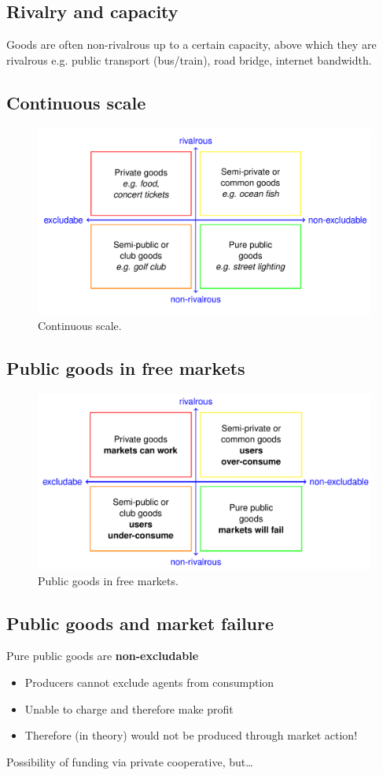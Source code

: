 \subsection{Rivalry and capacity}
Goods are often non-rivalrous up to a certain capacity, above which they are rivalrous e.g. public transport (bus/train), road bridge, internet bandwidth.
\subsection{Continuous scale}
\begin{figure}[H]
  \centering
  \includegraphics[width = \textwidth]{./img/figure14.png}
  \caption{Continuous scale.}
\end{figure}
\subsection{Public goods in free markets}
\begin{figure}[H]
  \centering
  \includegraphics[width = \textwidth]{./img/figure15.png}
  \caption{Public goods in free markets.}
\end{figure}
\subsection{Public goods and market failure}
Pure public goods are \textbf{non-excludable}
\begin{itemize}
  \item Producers cannot exclude agents from consumption
  \item Unable to charge and therefore make profit
  \item Therefore (in theory) would not be produced through market action!
\end{itemize}
Possibility of funding via private cooperative, but\dots

